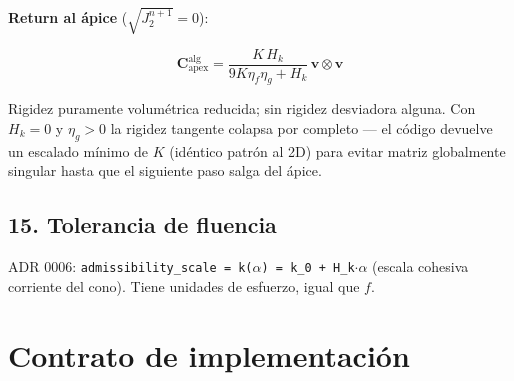 \documentclass[11pt,letterpaper,oneside]{report}
\begin{document}
\textbf{Return al ápice} ($\sqrt{J_2^{n+1}} = 0$):

\[
\mathbf C^\text{alg}_\text{apex} = \frac{K\,H_k}{9K\eta_f\eta_g + H_k}\,\mathbf v\otimes\mathbf v
\]

Rigidez puramente volumétrica reducida; sin rigidez desviadora alguna. Con $H_k = 0$ y $\eta_g > 0$ la rigidez tangente colapsa por completo --- el código devuelve un escalado mínimo de $K$ (idéntico patrón al 2D) para evitar matriz globalmente singular hasta que el siguiente paso salga del ápice.

\subsection{15. Tolerancia de fluencia}

ADR 0006: \texttt{admissibility\_scale = k(\ensuremath{\alpha}) = k\_0 + H\_k\ensuremath{\cdot}\ensuremath{\alpha}} (escala cohesiva corriente del cono). Tiene unidades de esfuerzo, igual que $f$.


\section{Contrato de implementación}
\end{document}
